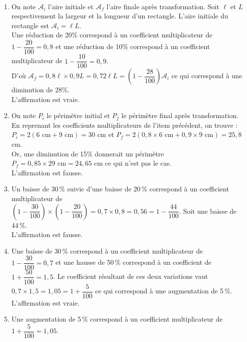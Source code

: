 \begin{corrige}
\ \\ [-5mm]
   \begin{enumerate}
      \item On note $\mathcal{A}_i$ l'aire initiale et $\mathcal{A}_f$ l'aire finale après transformation. Soit $\ell$ et $L$ respectivement la largeur et la longueur d'un rectangle. L'aire initiale du rectangle est $\mathcal{A}_i =\ell L$. \\
         Une réduction de 20\% correspond à un coefficient multiplicateur de $1-\dfrac{20}{100} =0,8$ et une réduction de 10\% correspond à un coefficient multiplicateur de $1-\dfrac{10}{100} =0,9$. \\
          D'où $\mathcal{A}_f =0,8\ell\times0,9L =0,72\ell L =\left(1-\dfrac{28}{100}\right)\mathcal{A}_i$ ce qui correspond à une diminution de 28\%. \\
         {\blue L'affirmation est vraie.}
      \item On note $P_i$ le périmètre initial et $P_f$ le périmètre final après transformation. En reprenant les coefficients multiplicateurs de l'item précédent, on trouve : \\
         $P_i =2(6\text{ cm}+9\text{ cm}) =30$ cm et $P_f =2(0,8\times6\text{ cm}+0,9\times9\text{ cm}) =25,8$ cm. \\
         Or, une diminution de 15\% donnerait un périmètre $P_f =0,85\times29\text{ cm} =24,65$ cm ce qui n'est pas le cas. \\
          {\blue L'affirmation est fausse.}
       \item Un baisse de 30\,\% suivie d'une baisse de 20\,\% correspond à un coefficient multiplicateur de \\ [1mm]
          $\left(1-\dfrac{30}{100}\right)\times\left(1-\dfrac{20}{100}\right) =0,7\times0,8 =0,56 =1-\dfrac{44}{100}$. Soit une baisse de 44\,\%. \\ [1mm]
          {\blue L'affirmation est fausse.}
       \item Une baisse de 30\,\% correspond à un coefficient multiplicateur de $1-\dfrac{30}{100} =0,7$ et une hausse de 50\,\% correspond à un coefficient de $1+\dfrac{50}{100} =1,5$. Le coefficient résultant de ces deux variations vaut $0,7\times1,5 =1,05 =1+\dfrac{5}{100}$ ce qui correspond à une augmentation de 5\,\%. \\ [1mm]
         {\blue L'affirmation est vraie.}
      \item Une augmentation de 5\,\% correspond à un coefficient multiplicateur de $1+\dfrac{5}{100} =1,05$. \\

\end{enumerate}
\end{corrige}

